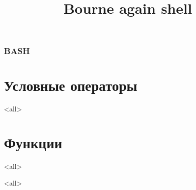 
\title[bash]{Bourne again shell}




\begin{frame}
	\frametitle{BASH}
	\titlepage
	\vspace{-0.5cm}
	\begin{center}
	\end{center}
\end{frame}



\section{Условные операторы}

\mode<all>{}


\section{Функции}

\mode<all>{}

\mode<all>

